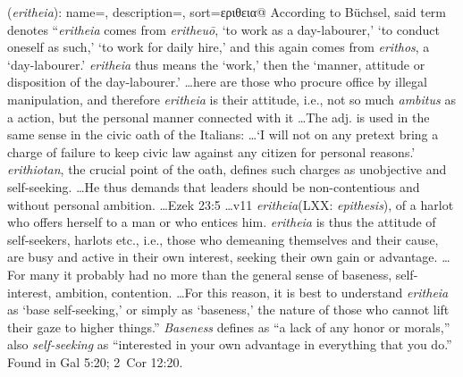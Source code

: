 \item[Self-seeking,]

(\textit{eritheia}):
{
    name=,
    description={},
    sort=εριθεια@
}
According to Büchsel, said term denotes ``\emph{eritheia} comes from \emph{eritheuō}, `to work as a day-labourer,' `to conduct oneself as such,' `to work for daily hire,' and this again comes from \emph{erithos}, a `day-labourer.' \emph{eritheia} thus means the `work,' then the `manner, attitude or disposition of the day-labourer.' \ldots here are those who procure office by illegal manipulation, and therefore \emph{eritheia} is their attitude, i.e., not so much \emph{ambitus} as a action, but the personal manner connected with it \ldots The adj. is used in the same sense in the civic oath of the Italians: \ldots `I will not on any pretext bring a charge of failure to keep civic law against any citizen for personal reasons.' \emph{erithiotan}, the crucial point of the oath, defines such charges as unobjective and self-seeking. \ldots He thus demands that leaders should be non-contentious and without personal ambition. \ldots Ezek 23:5 \ldots v11 \emph{eritheia}(LXX: \emph{epithesis}), of a harlot who offers herself to a man or who entices him. \emph{eritheia} is thus the attitude of self-seekers, harlots etc., i.e., those who demeaning themselves and their cause, are busy and active in their own interest, seeking their own gain or advantage. \ldots For many it probably had no more than the general sense of baseness, self-interest, ambition, contention. \ldots For this reason, it is best to understand \emph{eritheia} as `base self-seeking,' or simply as `baseness,' the nature of those who cannot lift their gaze to higher things.''
\emph{Baseness} defines as ``a lack of any honor or morals,'' also \emph{self-seeking} as ``interested in your own advantage in everything that you do.''
Found in Gal 5:20; 2~Cor 12:20.
